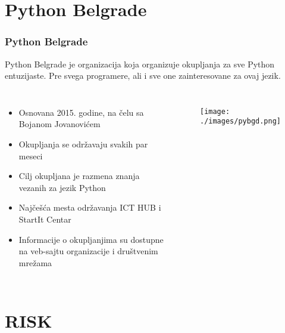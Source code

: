 \documentclass[hyperref={bookmarks=false},aspectratio=169]{beamer}
\begin{document}
\section{Python Belgrade}
\begin{frame}
\frametitle{Python Belgrade}
Python Belgrade je organizacija koja organizuje okupljanja za sve Python entuzijaste. Pre svega programere, ali i sve one zainteresovane za ovaj jezik.

\begin{columns}[T]

\begin{itemize}
    \item Osnovana 2015. godine, na čelu sa Bojanom Jovanovićem
    \item Okupljanja se održavaju svakih par meseci
    \item Cilj okupljana je razmena znanja vezanih za jezik Python
    \item Najčešća mesta održavanja ICT HUB i StartIt Centar
    \item Informacije o okupljanjima su dostupne na veb-sajtu organizacije i društvenim mrežama
\end{itemize}

\begin{figure}
    \raggedleft
    \texttt{[image: ./images/pybgd.png]}
\end{figure}

\end{columns}

\end{frame}

\section{RISK}
\end{document}
